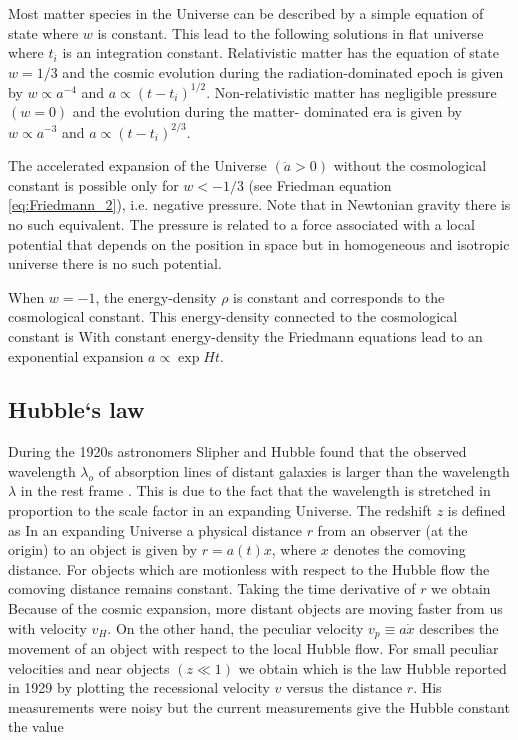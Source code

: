 Most matter species in the Universe can be described by a simple equation of state
where $w$ is constant. This lead to the following solutions in flat universe
where $t_i$ is an integration constant. Relativistic matter has the equation of state $w=1/3$ and the cosmic evolution during the radiation-dominated epoch is given by $w\propto a^{-4}$ and $a\propto(t-t_i)^{1/2}$. Non-relativistic matter has negligible pressure $(w=0)$ and the evolution during the matter- dominated era is given by $w\propto a^{-3}$ and $a\propto(t-t_i)^{2/3}$.

The accelerated expansion of the Universe $(\ddot a>0)$ without the cosmological constant is possible only for $w<-1/3$ (see Friedman equation \eqref{eq:Friedmann_2}), i.e. negative pressure. Note that in Newtonian gravity there is no such equivalent. The pressure is related to a force associated with a local potential that depends on the position in space but in homogeneous and isotropic universe there is no such potential.

When $w=-1$, the energy-density $\rho$ is constant and corresponds to the cosmological constant. This energy-density connected to the cosmological constant is
With constant energy-density the Friedmann equations lead to an exponential expansion $a\propto\exp{Ht}$.

\subsection{Hubble`s law}
During the 1920s astronomers Slipher and Hubble found that the observed wavelength $\lambda_o$ of absorption lines of distant galaxies is larger than the wavelength $\lambda$ in the rest frame \parencite{1929PNAS...15..168H}. This is due to the fact that the wavelength is stretched in proportion to the scale factor in an expanding Universe. The redshift $z$ is defined as
In an expanding Universe a physical distance $r$ from an observer (at the origin) to an object is given by $r=a(t)x$, where $x$ denotes the comoving distance. For objects which are motionless with respect to the Hubble flow the comoving distance remains constant. Taking the time derivative of $r$ we obtain
Because of the cosmic expansion, more distant objects are moving faster from us with velocity $v_H$. On the other hand, the peculiar velocity $v_p\equiv a\dot x$ describes the movement of an object with respect to the local Hubble flow. For small peculiar velocities and near objects $(z\ll1)$ we obtain
which is the law Hubble reported in 1929 by plotting the recessional velocity $v$ versus the distance $r$. His measurements were noisy but the current measurements give the Hubble constant the value \parencite{planck_cosm}

